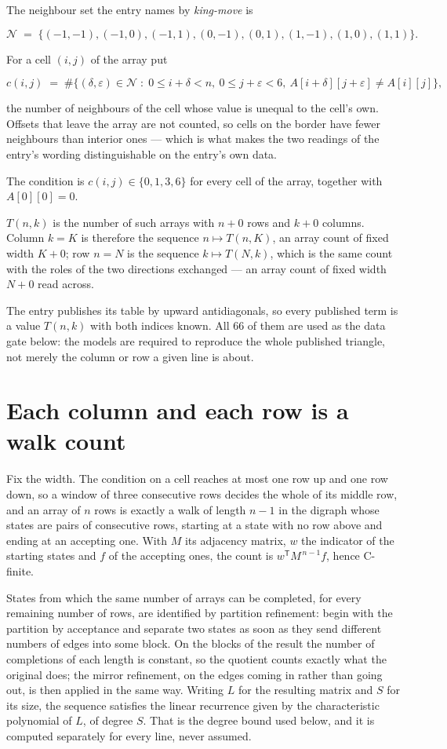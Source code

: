 \documentclass[11pt]{article}
\theoremstyle{definition}
\begin{document}
The neighbour set the entry names by {\itshape king-move} is

\[\mathcal{N} \;=\; \{(-1,-1), (-1,0), (-1,1), (0,-1), (0,1), (1,-1), (1,0), (1,1)\}.\]

For a cell $(i,j)$ of the array put

\[c(i,j) \;=\; \#\bigl\{(\delta,\varepsilon)\in\mathcal{N} \;:\; 0\le i+\delta<n,\ 0\le j+\varepsilon<6,\ A[i+\delta][j+\varepsilon] \neq A[i][j]\bigr\},\]

the number of neighbours of the cell whose value is unequal to the cell's own. Offsets that leave the array are not counted, so cells on the border have fewer neighbours than interior ones --- which is what makes the two readings of the entry's wording distinguishable on the entry's own data.

The condition is $c(i,j) \in \{0, 1, 3, 6\}$ for every cell of the array, together with $A[0][0]=0$.

$T(n,k)$ is the number of such arrays with $n + 0$ rows and $k + 0$ columns. Column $k = K$ is therefore the sequence $n \mapsto T(n,K)$, an array count of fixed width $K + 0$; row $n = N$ is the sequence $k \mapsto T(N,k)$, which is the same count with the roles of the two directions exchanged --- an array count of fixed width $N + 0$ read across.

The entry publishes its table by upward antidiagonals, so every published term is a value $T(n,k)$ with both indices known. All 66 of them are used as the data gate below: the models are required to reproduce the whole published triangle, not merely the column or row a given line is about.

\section{Each column and each row is a walk count}

Fix the width. The condition on a cell reaches at most one row up and one row down, so a window of three consecutive rows decides the whole of its middle row, and an array of $n$ rows is exactly a walk of length $n-1$ in the digraph whose states are pairs of consecutive rows, starting at a state with no row above and ending at an accepting one. With $M$ its adjacency matrix, $w$ the indicator of the starting states and $f$ of the accepting ones, the count is $w^{\mathsf T}M^{\,n-1}f$, hence C-finite.

States from which the same number of arrays can be completed, for every remaining number of rows, are identified by partition refinement: begin with the partition by acceptance and separate two states as soon as they send different numbers of edges into some block. On the blocks of the result the number of completions of each length is constant, so the quotient counts exactly what the original does; the mirror refinement, on the edges coming in rather than going out, is then applied in the same way. Writing $L$ for the resulting matrix and $S$ for its size, the sequence satisfies the linear recurrence given by the characteristic polynomial of $L$, of degree $S$. That is the degree bound used below, and it is computed separately for every line, never assumed.
\end{document}
